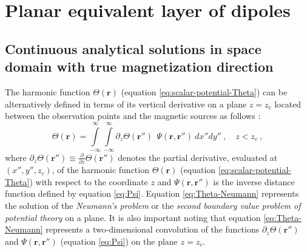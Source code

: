 \section{Planar equivalent layer of dipoles}
\label{sec:eqlayer}


\subsection{Continuous analytical solutions in space domain with true magnetization direction}
\label{subsec:space_domain_true_mag}


The harmonic function $\Theta(\mathbf{r})$ (equation \ref{eq:scalar-potential-Theta}) 
can be alternatively defined in terms of its vertical 
derivative on a plane $z = z_{c}$ located between the observation points and the 
magnetic sources as follows \cite[e.g.,][]{roy1962, reis_etal2020}:
\begin{equation}
\Theta(\mathbf{r}) =  
\int\limits_{-\infty}^{\infty} \int\limits_{-\infty}^{\infty}
\partial_{z} \Theta(\mathbf{r}'') \:\: 
\Psi(\mathbf{r}, \mathbf{r}'') \: dx''dy'' \: , \quad z < z_{c} \: ,
\label{eq:Theta-Neumann}
\end{equation}
where $\partial_{z} \Theta(\mathbf{r}'') \equiv 
\frac{\partial}{\partial z} \Theta(\mathbf{r}'')$ denotes the partial
derivative, evaluated at $(x'',y'',z_{c})$, of the harmonic function
$\Theta(\mathbf{r})$ (equation \ref{eq:scalar-potential-Theta}) with respect 
to the coordinate $z$ and $\Psi(\mathbf{r}, \mathbf{r}'')$ is the inverse 
distance function defined by equation \ref{eq:Psi}.
Equation \ref{eq:Theta-Neumann} represents the solution of the 
\textit{Neumann’s problem} or the \textit{second boundary value problem of potential
theory} \cite[][ p. 246]{kellogg1967} on a plane.
It is also important noting that equation \ref{eq:Theta-Neumann} represents a
two-dimensional convolution of the functions $\partial_{z} \Theta(\mathbf{r}'')$
and $\Psi(\mathbf{r}, \mathbf{r}'')$ (equation \ref{eq:Psi}) on the
plane $z = z_{c}$.


